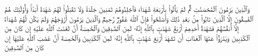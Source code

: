 \startbuffer[\q:24:4]
وَٱلَّذِینَ یَرۡمُونَ ٱلۡمُحۡصَنَٰتِ ثُمَّ لَمۡ یَأۡتُوا۟ بِأَرۡبَعَةِ شُهَدَاۤءَ فَٱجۡلِدُوهُمۡ ثَمَٰنِینَ جَلۡدَةࣰ وَلَا تَقۡبَلُوا۟ لَهُمۡ شَهَٰدَةً أَبَدࣰاۚ وَأُو۟لَٰۤئِكَ هُمُ ٱلۡفَٰسِقُونَ%
\stopbuffer
\startbuffer[\q:24:5]
إِلَّا ٱلَّذِینَ تَابُوا۟ مِنۢ بَعۡدِ ذَٰلِكَ وَأَصۡلَحُوا۟ فَإِنَّ ٱللَّهَ غَفُورࣱ رَّحِیمࣱ%
\stopbuffer
\startbuffer[\q:24:6]
وَٱلَّذِینَ یَرۡمُونَ أَزۡوَٰجَهُمۡ وَلَمۡ یَكُن لَّهُمۡ شُهَدَاۤءُ إِلَّاۤ أَنفُسُهُمۡ فَشَهَٰدَةُ أَحَدِهِمۡ أَرۡبَعُ شَهَٰدَٰتِۭ بِٱللَّهِ إِنَّهُۥ لَمِنَ ٱلصَّٰدِقِینَ%
\stopbuffer
\startbuffer[\q:24:7]
وَٱلۡخَٰمِسَةُ أَنَّ لَعۡنَتَ ٱللَّهِ عَلَیۡهِ إِن كَانَ مِنَ ٱلۡكَٰذِبِینَ%
\stopbuffer
\startbuffer[\q:24:8]
وَیَدۡرَؤُا۟ عَنۡهَا ٱلۡعَذَابَ أَن تَشۡهَدَ أَرۡبَعَ شَهَٰدَٰتِۭ بِٱللَّهِ إِنَّهُۥ لَمِنَ ٱلۡكَٰذِبِینَ%
\stopbuffer
\startbuffer[\q:24:9]
وَٱلۡخَٰمِسَةَ أَنَّ غَضَبَ ٱللَّهِ عَلَیۡهَاۤ إِن كَانَ مِنَ ٱلصَّٰدِقِینَ%
\stopbuffer
